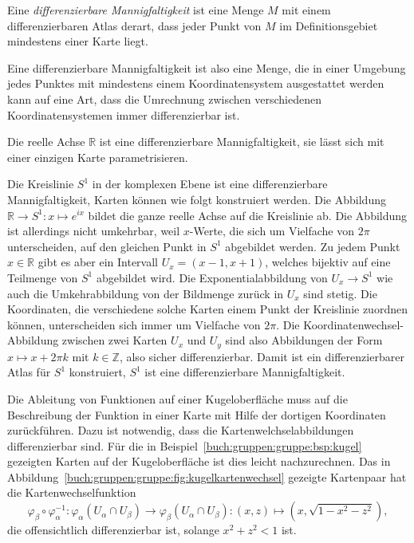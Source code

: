 \begin{definition}
\label{buch:gruppen:gruppe:def:diffman}
Eine {\em differenzierbare Mannigfaltigkeit} ist eine Menge $M$ mit einem
differenzierbaren Atlas derart, dass jeder Punkt von $M$ im
Definitionsgebiet mindestens einer Karte liegt.
\end{definition}

Eine differenzierbare Mannigfaltigkeit ist also eine Menge, die in
einer Umgebung jedes Punktes mit mindestens einem Koordinatensystem
ausgestattet werden kann auf eine Art, dass die Umrechnung zwischen
verschiedenen Koordinatensystemen immer differenzierbar ist.

\begin{beispiel}
Die reelle Achse $\mathbb{R}$ ist eine differenzierbare Mannigfaltigkeit,
sie lässt sich mit einer einzigen Karte parametrisieren.
\end{beispiel}

\begin{beispiel}
Die Kreislinie $S^1$ in der komplexen Ebene ist eine differenzierbare
Mannigfaltigkeit, Karten können wie folgt konstruiert werden.
Die Abbildung $\mathbb{R}\to S^1: x\mapsto e^{ix}$ bildet die ganze
reelle Achse auf die Kreislinie ab.
Die Abbildung ist allerdings nicht umkehrbar, weil $x$-Werte, die sich
um Vielfache von $2\pi$ unterscheiden, auf den gleichen Punkt in $S^1$
abgebildet werden.
Zu jedem Punkt $x\in\mathbb{R}$ gibt es aber ein Intervall
$U_x=(x-1,x+1)$, welches bijektiv auf eine Teilmenge von $S^1$
abgebildet wird.
Die Exponentialabbildung von $U_x\to S^1$ wie auch die Umkehrabbildung
von der Bildmenge zurück in $U_x$ sind stetig.
Die Koordinaten, die verschiedene solche Karten einem Punkt der Kreislinie
zuordnen können, unterscheiden sich immer um Vielfache von $2\pi$.
Die Koordinatenwechsel-Abbildung zwischen zwei Karten $U_x$ und $U_y$
sind also Abbildungen der Form $x\mapsto x+2\pi k$ mit $k\in\mathbb{Z}$,
also sicher differenzierbar.
Damit ist ein differenzierbarer Atlas für $S^1$ konstruiert, $S^1$
ist eine differenzierbare Mannigfaltigkeit.
\end{beispiel}

\begin{beispiel}

Die Ableitung von Funktionen auf einer Kugeloberfläche muss auf 
die Beschreibung der Funktion in einer Karte mit Hilfe der dortigen
Koordinaten zurückführen.
Dazu ist notwendig, dass die Kartenwelchselabbildungen differenzierbar
sind.
Für die in Beispiel~\ref{buch:gruppen:gruppe:bsp:kugel} gezeigten
Karten auf der Kugeloberfläche ist dies leicht nachzurechnen.
Das in Abbildung~\ref{buch:gruppen:gruppe:fig:kugelkartenwechsel} gezeigte
Kartenpaar hat die Kartenwechselfunktion
\[
\varphi_\beta
\circ
\varphi_\alpha^{-1}
\colon
\varphi_\alpha(U_\alpha\cap U_\beta)
\to
\varphi_\beta(U_\alpha\cap U_\beta)
:
(x,z) \mapsto (x,\!\sqrt{1-x^2-z^2}),
\]
die offensichtlich differenzierbar ist, solange $x^2+z^2<1$ ist.
\end{beispiel}

